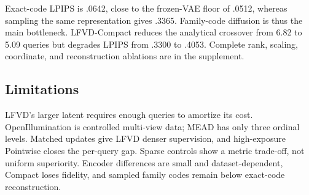 Exact-code LPIPS is .0642, close to the frozen-VAE floor of .0512, whereas
sampling the same representation gives .3365. Family-code diffusion is thus
the main bottleneck. LFVD-Compact reduces the analytical crossover from 6.82
to 5.09 queries but degrades LPIPS from .3300 to .4053. Complete rank,
scaling, coordinate, and reconstruction ablations are in the supplement.

\subsection{Limitations}

LFVD's larger latent requires enough queries to amortize its cost.
OpenIllumination is controlled multi-view data; MEAD has only three ordinal
levels. Matched updates give LFVD denser supervision, and high-exposure
Pointwise closes the per-query gap. Sparse controls show a metric trade-off,
not uniform superiority. Encoder differences are small and dataset-dependent,
Compact loses fidelity, and sampled family codes remain below exact-code
reconstruction.
